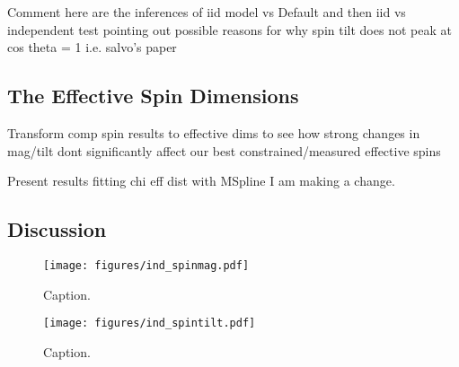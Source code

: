 
Comment here are the inferences of iid model vs Default and then iid vs independent test pointing out possible reasons for why spin tilt 
does not peak at cos theta = 1 i.e. salvo's paper

\subsection{The Effective Spin Dimensions}

Transform comp spin results to effective dims to see how strong changes in mag/tilt dont significantly affect our best constrained/measured
effective spins

Present results fitting chi eff dist with MSpline I am making a change. 

\subsection{Discussion}

\begin{figure}
    \texttt{[image: figures/ind\_spinmag.pdf]}
    \caption{Caption.}
    \label{fig:ind_spinmag_dist}
\end{figure}

\begin{figure}
        \texttt{[image: figures/ind\_spintilt.pdf]}
        \caption{Caption.}
        \label{fig:ind_spintilt_dist}
\end{figure}

